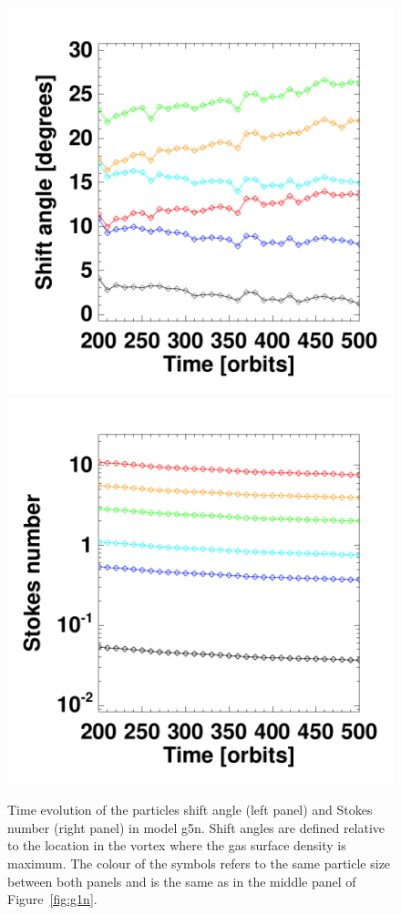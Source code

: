 \documentclass[a4paper,usenatbib]{mnras}
\begin{document}
\begin{figure}
\centering
\includegraphics[width=0.49\hsize]{f2a.pdf}
\includegraphics[width=0.49\hsize]{f2b.pdf}
\caption{\label{fig:g1n_shift_ts}Time evolution of the particles shift
  angle (left panel) and Stokes number (right panel) in model
  g5n. Shift angles are defined relative to the location in the vortex
  where the gas surface density is maximum. The colour of the symbols
  refers to the same particle size between both panels and is the same
  as in the middle panel of Figure~\ref{fig:g1n}.}
\end{figure}
\end{document}
